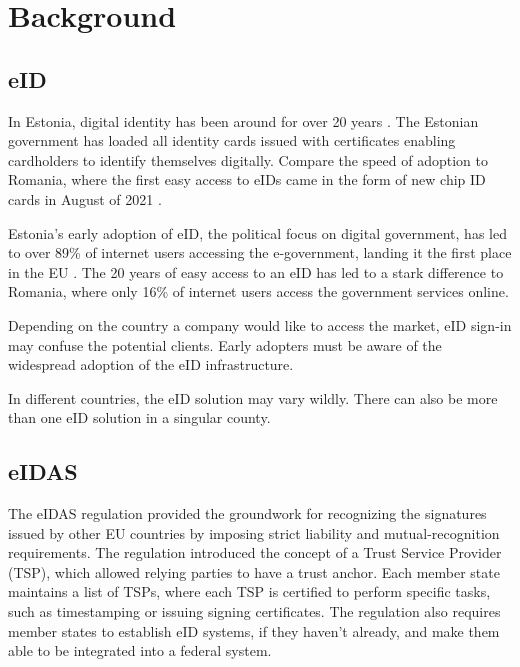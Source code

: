 \section{Background}




\subsection{eID}

In Estonia, digital identity has been around for over 20 years \cite{eelaw-idcard}. The Estonian government has loaded all identity cards issued with certificates enabling cardholders to identify themselves digitally. Compare the speed of adoption to Romania, where the first easy access to eIDs came in the form of new chip ID cards in August of 2021 \cite{romania-adopts-eid}.

Estonia's early adoption of eID, the political focus on digital government, has led to over 89\% of internet users accessing the e-government, landing it the first place in the EU \cite{eu-desi}. The 20 years of easy access to an eID has led to a stark difference to Romania, where only 16\% of internet users access the government services online.

Depending on the country a company would like to access the market, eID sign-in may confuse the potential clients. Early adopters must be aware of the widespread adoption of the eID infrastructure.

In different countries, the eID solution may vary wildly. There can also be more than one eID solution in a singular county.


\subsection{eIDAS}

The eIDAS regulation \cite{eulaw-eidas} provided the groundwork for recognizing the signatures issued by other EU countries by imposing strict liability and mutual-recognition requirements. The regulation introduced the concept of a Trust Service Provider (TSP), which allowed relying parties to have a trust anchor. Each member state maintains a list of TSPs, where each TSP is certified to perform specific tasks, such as timestamping or issuing signing certificates. The regulation also requires member states to establish eID systems, if they haven't already, and make them able to be integrated into a federal system.

